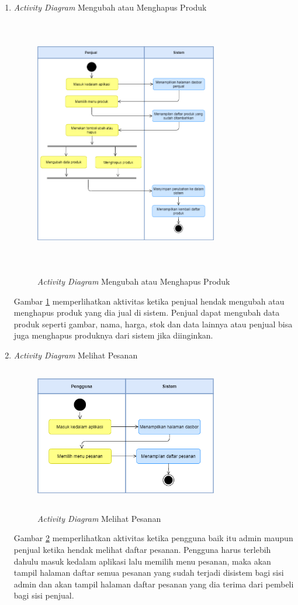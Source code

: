 \begin{enumerate}
	\newpage
	\item \textit{Activity Diagram} Mengubah atau Menghapus Produk
	\begin{figure}[H]
		\centering
		{\includegraphics [width = 8cm, height= 11cm]{gambar/activity diagram/ubah atau hapus produk}}
		\caption{\textit{Activity Diagram} Mengubah atau Menghapus Produk}
		\label{ubah atau hapus produk}
	\end{figure}
	\par Gambar \ref*{ubah atau hapus produk} memperlihatkan aktivitas ketika penjual hendak mengubah atau menghapus produk yang dia jual di sistem. Penjual dapat mengubah data produk seperti gambar, nama, harga, stok dan data lainnya atau penjual bisa juga menghapus produknya dari sistem jika diinginkan.

	\item \textit{Activity Diagram} Melihat Pesanan
	\begin{figure}[H]
		\centering
		{\includegraphics [width = 8cm, height= 6cm]{gambar/activity diagram/lihat pesanan}}
		\caption{\textit{Activity Diagram} Melihat Pesanan}
		\label{lihat pesanan}
	\end{figure}
	\par Gambar \ref*{lihat pesanan} memperlihatkan aktivitas ketika pengguna baik itu admin maupun penjual ketika hendak melihat daftar pesanan. Pengguna harus terlebih dahulu masuk kedalam aplikasi lalu memilih menu pesanan, maka akan tampil halaman daftar semua pesanan yang sudah terjadi disistem bagi sisi admin dan akan tampil halaman daftar pesanan yang dia terima dari pembeli bagi sisi penjual.


\end{enumerate}
